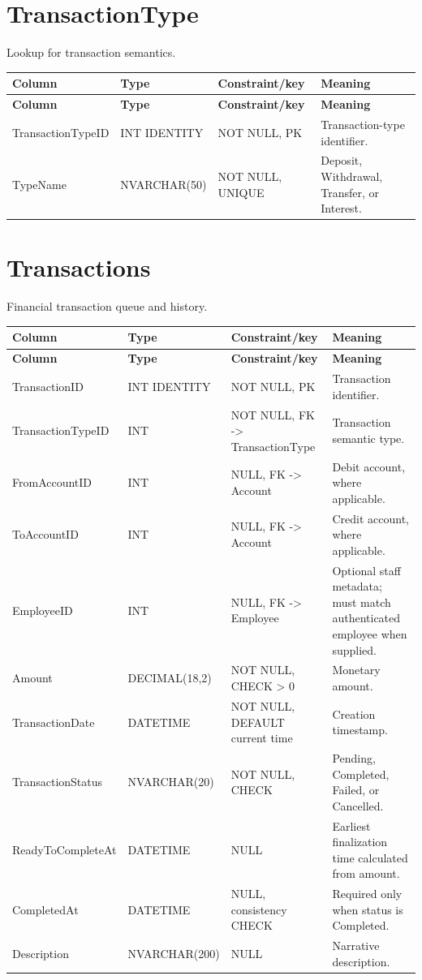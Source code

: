 \documentclass[11pt,a4paper,oneside]{report}
\begin{document}
\section{TransactionType}
Lookup for transaction semantics.
\begin{longtable}{L{0.21\textwidth}L{0.18\textwidth}L{0.24\textwidth}L{0.31\textwidth}}
\toprule
\textbf{Column} & \textbf{Type} & \textbf{Constraint/key} & \textbf{Meaning}\\
\midrule\endfirsthead
\toprule\textbf{Column} & \textbf{Type} & \textbf{Constraint/key} & \textbf{Meaning}\\\midrule\endhead
TransactionTypeID & INT IDENTITY & NOT NULL, PK & Transaction-type identifier.\\
TypeName & NVARCHAR(50) & NOT NULL, UNIQUE & Deposit, Withdrawal, Transfer, or Interest.\\
\bottomrule
\end{longtable}

\section{Transactions}
Financial transaction queue and history.
\begin{longtable}{L{0.21\textwidth}L{0.18\textwidth}L{0.24\textwidth}L{0.31\textwidth}}
\toprule
\textbf{Column} & \textbf{Type} & \textbf{Constraint/key} & \textbf{Meaning}\\
\midrule\endfirsthead
\toprule\textbf{Column} & \textbf{Type} & \textbf{Constraint/key} & \textbf{Meaning}\\\midrule\endhead
TransactionID & INT IDENTITY & NOT NULL, PK & Transaction identifier.\\
TransactionTypeID & INT & NOT NULL, FK -> TransactionType & Transaction semantic type.\\
FromAccountID & INT & NULL, FK -> Account & Debit account, where applicable.\\
ToAccountID & INT & NULL, FK -> Account & Credit account, where applicable.\\
EmployeeID & INT & NULL, FK -> Employee & Optional staff metadata; must match authenticated employee when supplied.\\
Amount & DECIMAL(18,2) & NOT NULL, CHECK > 0 & Monetary amount.\\
TransactionDate & DATETIME & NOT NULL, DEFAULT current time & Creation timestamp.\\
TransactionStatus & NVARCHAR(20) & NOT NULL, CHECK & Pending, Completed, Failed, or Cancelled.\\
ReadyToCompleteAt & DATETIME & NULL & Earliest finalization time calculated from amount.\\
CompletedAt & DATETIME & NULL, consistency CHECK & Required only when status is Completed.\\
Description & NVARCHAR(200) & NULL & Narrative description.\\
\bottomrule
\end{longtable}
\end{document}
